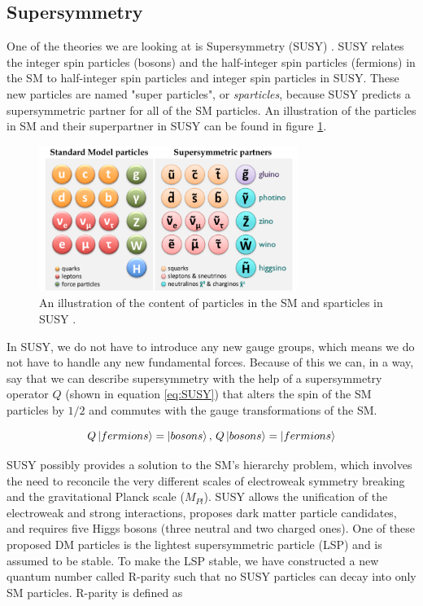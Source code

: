 \subsection{Supersymmetry}
\label{sec:SUSY}
One of the theories we are looking at is Supersymmetry (SUSY) \cite{sleptonexclusion}. SUSY relates the integer spin particles (bosons) and the half-integer spin particles (fermions) in the SM to half-integer spin particles and integer spin particles in SUSY. These new particles are named "super particles", or \textit{sparticles}, because SUSY predicts a supersymmetric partner for all of the SM particles. An illustration of the particles in SM and their superpartner in SUSY can be found in figure \ref{fig:smandsusy}.

\begin{figure}[H]
    \centering
    \includegraphics[width = 0.75\textwidth]{Figures/FromOnline/susy_particles.png}
    \caption{An illustration of the content of particles in the SM and sparticles in SUSY \cite{SUSYpic}.}
    \label{fig:smandsusy}
\end{figure}

In SUSY, we do not have to introduce any new gauge groups, which means we do not have to handle any new fundamental forces. Because of this we can, in a way, say that we can describe supersymmetry with the help of a supersymmetry operator $Q$ (shown in equation \ref{eq:SUSY}) that alters the spin of the SM particles by $1/2$ and commutes with the gauge transformations of the SM. 

\begin{equation}
    \label{eq:SUSY}
    Q\ket{fermions} = \ket{bosons} \text{,   }  Q\ket{bosons} =\ket{fermions}
\end{equation}

SUSY possibly provides a solution to the SM's hierarchy problem, which involves the need to reconcile the very different scales of electroweak symmetry breaking and the gravitational Planck scale ($M_{Pl}$). SUSY allows the unification of the electroweak and strong interactions, proposes dark matter particle candidates, and requires five Higgs bosons (three neutral and two charged ones). One of these proposed DM particles is the lightest supersymmetric particle (LSP) and is assumed to be stable. To make the LSP stable, we have constructed a new quantum number called R-parity such that no SUSY particles can decay into only SM particles. R-parity is defined as 

